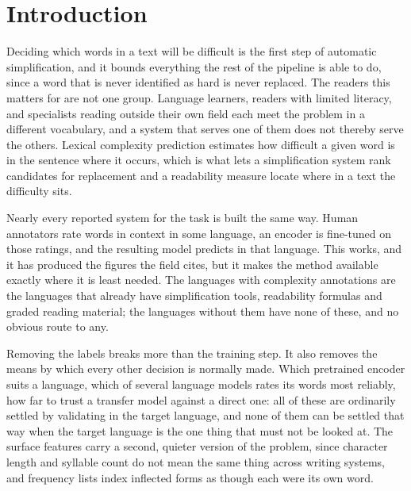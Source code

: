 \section{Introduction}
\label{sec:intro}

Deciding which words in a text will be difficult is the first step of
automatic simplification, and it bounds everything the rest of the
pipeline is able to do, since a word that is never identified as hard is
never replaced. The readers this matters for are not one group.
Language learners, readers with limited literacy, and specialists
reading outside their own field each meet the problem in a different
vocabulary, and a system that serves one of them does not thereby serve
the others. Lexical complexity prediction estimates how difficult a
given word is in the sentence where it occurs, which is what lets a
simplification system rank candidates for replacement and a readability
measure locate where in a text the difficulty sits.

Nearly every reported system for the task is built the same way. Human
annotators rate words in context in some language, an encoder is
fine-tuned on those ratings, and the resulting model predicts in that
language. This works, and it has produced the figures the field cites,
but it makes the method available exactly where it is least needed. The
languages with complexity annotations are the languages that already
have simplification tools, readability formulas and graded reading
material; the languages without them have none of these, and no obvious
route to any.

Removing the labels breaks more than the training step. It also removes
the means by which every other decision is normally made. Which
pretrained encoder suits a language, which of several language models
rates its words most reliably, how far to trust a transfer model against
a direct one: all of these are ordinarily settled by validating in the
target language, and none of them can be settled that way when the
target language is the one thing that must not be looked at. The surface
features carry a second, quieter version of the problem, since character
length and syllable count do not mean the same thing across writing
systems, and frequency lists index inflected forms as though each were
its own word.

